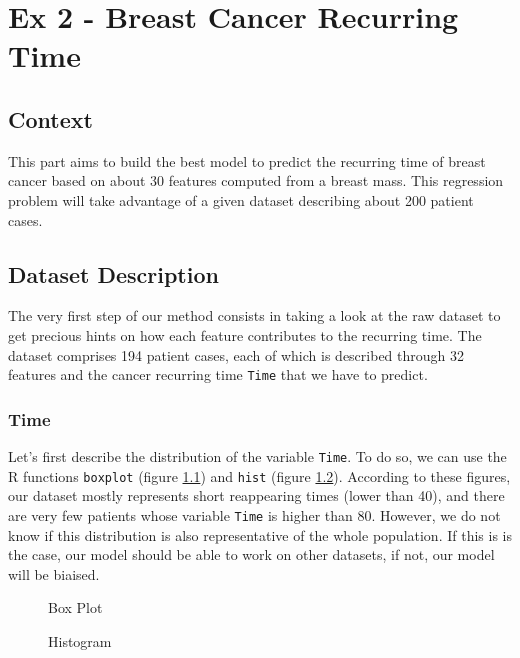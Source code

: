 \documentclass[]{report}
\newcommand{\inputtikz}[2]{%
	\scalebox{#1}{}  
}
\begin{document}
\chapter{Ex 2 - Breast Cancer Recurring Time}

\section{Context}
This part aims to build the best model to predict the recurring time of breast cancer based on about 30 features computed from a breast mass.  This regression problem will take advantage of a given dataset describing about 200 patient cases.

\section{Dataset Description}
The very first step of our method consists in taking a look at the raw dataset to get precious hints on how each feature contributes to the recurring time. The dataset comprises 194 patient cases, each of which is described through 32 features and the cancer recurring time \texttt{Time} that we have to predict.

\subsection{Time}
Let's first describe the distribution of the variable \texttt{Time}. To do so, we can use the R functions \texttt{boxplot} (figure \ref{fig:time_boxplot}) and \texttt{hist} (figure \ref{fig:time_hist}). According to these figures, our dataset mostly represents short reappearing times (lower than 40), and there are very few patients whose variable \texttt{Time} is higher than 80. However, we do not know if this distribution is also representative of the whole population. If this is is the case, our model should be able to work on other datasets, if not, our model will be biaised.

\begin{figure}[!hb]
	\centering
	\inputtikz{0.5}{Figures/time_boxplot.tex}
	\caption{Box Plot}
	\label{fig:time_boxplot}
\end{figure}

\begin{figure}[!h]
	\centering
	\inputtikz{0.5}{Figures/time_hist.tex}
	\caption{Histogram}
	\label{fig:time_hist}
\end{figure}
\end{document}

